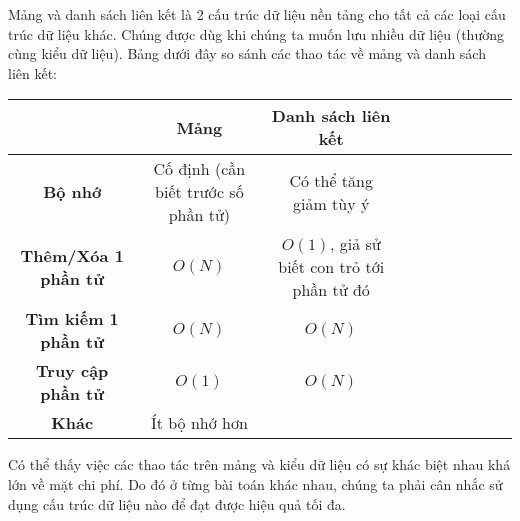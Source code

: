 \documentclass{article}
\begin{document}
Mảng và danh sách liên kết là 2 cấu trúc dữ liệu nền tảng cho tất cả các loại cấu trúc dữ liệu khác. Chúng được dùg khi chúng ta muốn lưu nhiều dữ liệu (thường cùng kiểu dữ liệu). Bảng dưới đây so sánh các thao tác về mảng và danh sách liên kết: \\
\begin{center}
        \begin{tabular}{|c|c| c|c| c|c| c|c| c|c|}
            \hline
                 & \textbf{Mảng} & \textbf{Danh sách liên kết} \\
            \hline
                \textbf{Bộ nhớ} & Cố định (cần biết trước số phần tử) & Có thể tăng giảm tùy ý\\
            \hline
                \textbf{Thêm/Xóa 1 phần tử} & $O(N)$ & 	$O(1)$, giả sử biết con trỏ tới phần tử đó\\
            \hline 
                \textbf{Tìm kiếm 1 phần tử} & $O(N)$ & 	$O(N)$\\
            \hline
                \textbf{Truy cập phần tử} & $O(1)$ & $O(N)$\\
            \hline
                \textbf{Khác} &  Ít bộ nhớ hơn & \\
            \hline
        \end{tabular}
\end{center}

Có thể thấy việc các thao tác trên mảng và kiểu dữ liệu có sự khác biệt nhau khá lớn về mặt chi phí. Do đó ở từng bài toán khác nhau, chúng ta phải cân nhắc sử dụng cấu trúc dữ liệu nào để đạt được hiệu quả tối đa.


\end{document}
